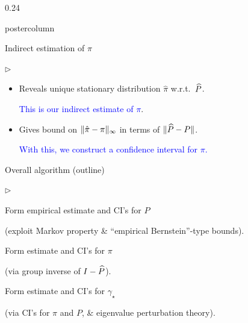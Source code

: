 \documentclass[notheorems,final]{beamer}
\newcommand{\compresslist}{%
  \setlength{\itemsep}{1pt}%
  \setlength{\parskip}{0pt}%
  \setlength{\parsep}{0pt}%
  \setlength{\leftmargin}{0.7cm}%
}
\newcommand{\BLUE}[1]{\textcolor{blue}{#1}}
\newcommand\gap{\ensuremath{\gamma_{\star}}}
\begin{document}
\begin{frame}{}
\begin{columns}
\begin{column}{0.24\textwidth}
\begin{beamercolorbox}[center,wd=\textwidth]{postercolumn}
\begin{minipage}[T]{.95\textwidth}
{\begin{block}{Indirect estimation of $\pi$}
\begin{list}{$\triangleright$}
\begin{itemize}
                        \smallskip

                      \item
                        Reveals unique stationary distribution $\hat\pi$ w.r.t.~$\widehat P$.

                        \BLUE{This is our indirect estimate of $\pi$}.

                        \smallskip

                      \item
                        Gives
                        bound on $\|\hat\pi-\pi\|_\infty$ in terms of
                        $\|\widehat P - P\|$.

                        \BLUE{With this, we construct a confidence interval
                        for $\pi$.}

                    \end{itemize}

                \end{list}

              \end{block}

              \begin{block}{Overall algorithm (outline)}
                \begin{list}{$\triangleright$}\compresslist
                  \item
                    Form empirical estimate and CI's for $P$

                    {\small(exploit Markov property \& ``empirical Bernstein''-type bounds)}.

                    \medskip

                  \item
                    Form estimate and CI's for $\pi$

                    {\small(via group inverse of $I - \widehat P$)}.

                    \medskip

                  \item
                    Form estimate and CI's for $\gap$

                    {\small(via CI's for $\pi$ and $P$, \& eigenvalue perturbation theory)}.

                \end{list}

              \end{block}
            }
          \end{minipage}
        \end{beamercolorbox}
      \end{column}
    \end{columns}

    \vfill
  \end{frame}
\end{document}

